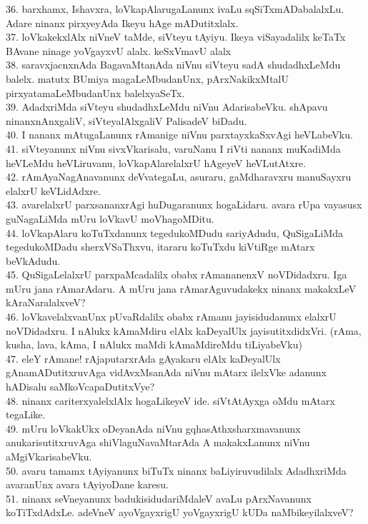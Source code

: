 \documentclass{article}
\begin{document}
36. barxhamx, Ishavxra, loVkapAlarugaLanunx ivaLu sqSiTxmADabalalxLu. Adare ninanx pirxyeyAda Ikeyu hAge mADutitxlalx.\\
37. loVkakekxlAlx niVneV taMde, siVteyu tAyiyu. Ikeya viSayadalilx keTaTx BAvane ninage yoVgayxvU alalx. keSxVmavU alalx\\
38. saravxjacnxnAda BagavaMtanAda niVnu siVteyu sadA shudadhxLeMdu balelx. matutx BUmiya magaLeMbudanUnx, pArxNakikxMtalU pirxyatamaLeMbudanUnx balelxyaSeTx.\\
39. AdadxriMda siVteyu shudadhxLeMdu niVnu AdarisabeVku. shApavu ninanxnAnxgaliV, siVteyalAlxgaliV PalisadeV biDadu.\\
40. I nananx mAtugaLanunx rAmanige niVnu parxtayxkaSxvAgi heVLabeVku.\\
41. siVteyanunx niVnu sivxVkarisalu, varuNanu I riVti nananx muKadiMda heVLeMdu heVLiruvanu, loVkapAlarelalxrU hAgeyeV heVLutAtxre.\\
42. rAmAyaNagAnavanunx deVvategaLu, asuraru, gaMdharavxru manuSayxru elalxrU keVLidAdxre.\\
43. avarelalxrU parxsananxrAgi huDugaranunx hogaLidaru. avara rUpa vayasusx guNagaLiMda mUru loVkavU moVhagoMDitu.\\
44. loVkapAlaru koTuTxdanunx tegedukoMDudu sariyAdudu, QuSigaLiMda tegedukoMDadu sherxVSaThxvu, itararu koTuTxdu kiVtiRge mAtarx beVkAdudu.\\
45. QuSigaLelalxrU parxpaMcadalilx obabx rAmananenxV noVDidadxru. Iga mUru jana rAmarAdaru. A mUru jana rAmarAguvudakekx ninanx makakxLeV kAraNaralalxveV?\\
46. loVkavelalxvanUnx pUvaRdalilx obabx rAmanu jayisidudanunx elalxrU noVDidadxru. I nAlukx kAmaMdiru elAlx kaDeyalUlx jayisutitxdidxVri. (rAma, kusha, lava, kAma, I nAlukx maMdi kAmaMdireMdu tiLiyabeVku)\\
47. eleY rAmane! rAjaputarxrAda gAyakaru elAlx kaDeyalUlx gAnamADutitxruvAga vidAvxMsanAda niVnu mAtarx ilelxVke adanunx hADisalu saMkoVcapaDutitxVye?\\
48. ninanx cariterxyalelxlAlx hogaLikeyeV ide. siVtAtAyxga oMdu mAtarx tegaLike.\\
49. mUru loVkakUkx oDeyanAda niVnu gqhasAthxsharxmavanunx anukarisutitxruvAga shiVlaguNavaMtarAda A makakxLanunx niVnu aMgiVkarisabeVku.\\
50. avaru tamamx tAyiyanunx biTuTx ninanx baLiyiruvudilalx AdadhxriMda avaranUnx avara tAyiyoDane karesu.\\
51. ninanx seVneyanunx badukisidudariMdaleV avaLu pArxNavanunx koTiTxdAdxLe. adeVneV ayoVgayxrigU yoVgayxrigU kUDa naMbikeyilalxveV?\\
\end{document}
